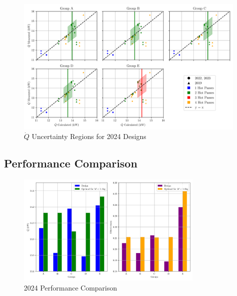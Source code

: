 \documentclass{article}
\begin{document}
\begin{figure}[H]
    \centering
    \includegraphics[width=0.99\textwidth]{Qdot_uncertainty_bands.png}
    \caption{$\dot{Q}$ Uncertainty Regions for 2024 Designs}
    \label{fig:uncertainty}
\end{figure}

\subsection{Performance Comparison}


\begin{figure}[H]
    \centering
    \includegraphics[width=0.8\textwidth]{2024comparison.png}
    \caption{2024 Performance Comparison}
    \label{fig:2024_performance}
\end{figure}
\end{document}
